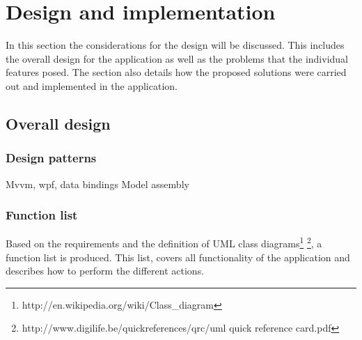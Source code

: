 \section{Design and implementation}

In this section the considerations for the
design will be discussed. This includes the overall design for the application
as well as the problems that the individual features posed. The section also
details how the proposed solutions were carried out and implemented in the
application.

\subsection{Overall design}
\subsubsection{Design patterns}

Mvvm, wpf, data bindings Model assembly

\subsubsection{Function list}
Based on the requirements and the definition of UML class 
diagrams\footnote{http://en.wikipedia.org/wiki/Class\_diagram} 
\footnote{http://www.digilife.be/quickreferences/qrc/uml quick reference 
card.pdf}, a function list is produced. This list, covers all functionality of 
the application and describes how to perform the different actions.

